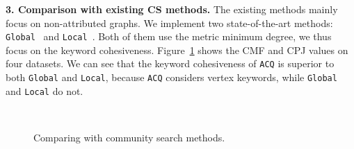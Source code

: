 {\bf 3. Comparison with existing CS methods.}
The existing methods mainly focus on non-attributed graphs. We implement two state-of-the-art methods:
{\tt Global}~\cite{KDD2010} and {\tt Local}~\cite{local2014}. Both of them use the metric minimum degree, we thus focus on the keyword cohesiveness. Figure~\ref{fig:search-comp} shows the CMF and CPJ values on four datasets. We can see that the keyword cohesiveness of {\tt ACQ} is superior to both {\tt Global} and {\tt Local}, because {\tt ACQ} considers vertex keywords, while {\tt Global} and {\tt Local} do not.

\begin{figure}[ht]
    \centering
    \mbox{
        \hspace{2ex}
    }
    \caption{Comparing with community search methods.}
    \label{fig:search-comp}
\end{figure}

